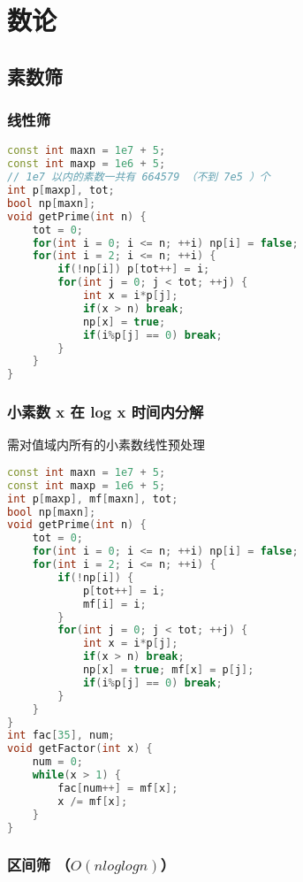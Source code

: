 

\section{数论}
\subsection{素数筛}
\subsubsection{线性筛}

\begin{lstlisting}[language=C++]
const int maxn = 1e7 + 5;
const int maxp = 1e6 + 5;
// 1e7 以内的素数一共有 664579 （不到 7e5 ）个
int p[maxp], tot;
bool np[maxn];
void getPrime(int n) {
    tot = 0;
    for(int i = 0; i <= n; ++i) np[i] = false;
    for(int i = 2; i <= n; ++i) {
        if(!np[i]) p[tot++] = i;
        for(int j = 0; j < tot; ++j) {
            int x = i*p[j];
            if(x > n) break;
            np[x] = true;
            if(i%p[j] == 0) break;
        }
    }
}
\end{lstlisting}

\subsubsection{小素数 x 在 log x 时间内分解}

需对值域内所有的小素数线性预处理

\begin{lstlisting}[language=C++]
const int maxn = 1e7 + 5;
const int maxp = 1e6 + 5;
int p[maxp], mf[maxn], tot;
bool np[maxn];
void getPrime(int n) {
    tot = 0;
    for(int i = 0; i <= n; ++i) np[i] = false;
    for(int i = 2; i <= n; ++i) {
        if(!np[i]) {
            p[tot++] = i;
            mf[i] = i;
        }
        for(int j = 0; j < tot; ++j) {
            int x = i*p[j];
            if(x > n) break;
            np[x] = true; mf[x] = p[j];
            if(i%p[j] == 0) break;
        }
    }
}
int fac[35], num;
void getFactor(int x) {
    num = 0;
    while(x > 1) {
        fac[num++] = mf[x];
        x /= mf[x];
    }
}
\end{lstlisting}

\subsubsection{区间筛 （$O(nloglogn)$）}


